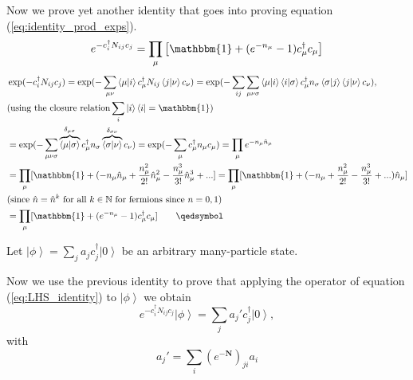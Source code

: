 Now we prove yet another identity that goes into proving equation (\ref{eq:identity_prod_exps}).
\begin{equation}\label{eq:LHS_identity}
e^{-c_i^\dagger N_{ij} c_j} = \prod_\mu \big[ \mathbbm{1} + ( e^{-n_\mu} - 1 ) c_\mu^\dagger c_\mu \big]
\end{equation}
\begin{equation*}
\begin{split}
&\exp({-c_i^\dagger N_{ij} c_j}) = \exp({ - \sum_{\mu\nu} \left\langle \mu | i \right\rangle c_\mu^\dagger N_{ij} \left\langle j | \nu \right\rangle c_\nu }) = \exp({-\sum_{ij}\sum_{ \mu\nu\sigma} \left\langle \mu | i \right\rangle  \left\langle i | \sigma \right\rangle c_\mu^\dagger n_\sigma \left\langle \sigma | j \right\rangle \left\langle j | \nu \right\rangle c_\nu }) , \\
& \text{(using the closure relation} \sum_i \left| i \right\rangle \left\langle i \right|= \mathbbm{1} \text{)} \\
&= \exp({-\sum_{ \mu\nu\sigma} \overbrace{\left\langle \mu | \sigma \right\rangle}^{\delta_{\mu\sigma}}  c_\mu^\dagger n_\sigma \overbrace{\left\langle \sigma | \nu \right\rangle}^{\delta_{\sigma\nu}} c_\nu }) = \exp({-\sum_\mu c_\mu^\dagger n_\mu c_\mu}) = \prod_\mu e^{-n_\mu \hat{n}_\mu} \\
&= \prod_\mu [ \mathbbm{1} + ( - n_\mu \hat{n}_\mu + \frac{n_\mu^2}{2!} \hat{n}_\mu^2 - \frac{n_\mu^3}{3!} \hat{n}_\mu^3 + ... ] = \prod_\mu [ \mathbbm{1} + ( - n_\mu + \frac{n_\mu^2}{2!} - \frac{n_\mu^3}{3!} + ... ) \hat{n}_\mu ] \\
& \text{(since  } \hat{n} = \hat{n}^k \text{  for all  } k \in \mathbb{N} \text{  for fermions since  } n = 0, 1 ) \\
&= \prod_\mu [ \mathbbm{1} + ( e^{-n_\mu} - 1 ) c_\mu^\dagger c_\mu ] \quad\quad \qedsymbol
\end{split}
\end{equation*}

Let 
$
\left| \phi \right\rangle = \sum_j a_j c_j^\dagger \left| 0 \right\rangle
$
be an arbitrary many-particle state. 

Now we use the previous identity to prove that applying the operator of equation (\ref{eq:LHS_identity}) to $\left| \phi \right\rangle$ we obtain
\begin{equation}
e^{-c_i^\dagger N_{ij} c_j} \left| \phi \right\rangle = \sum_j a_j' c_j^\dagger \left| 0 \right\rangle , 
\end{equation}
with
\begin{equation}
a_j' = \sum_{i} (e^{-\bm N})_{ji} a_i
\end{equation}

